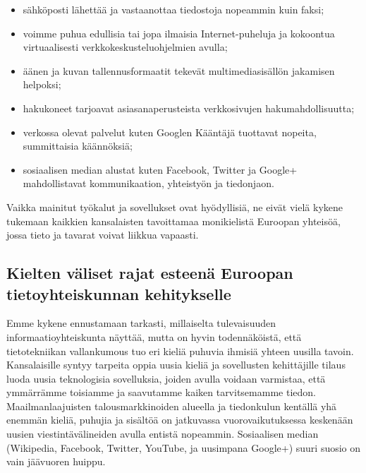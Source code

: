 \begin{multicols}{2}
\begin{itemize}
\item sähköposti lähettää ja vastaanottaa tiedostoja nopeammin kuin faksi;

\item voimme puhua edullisia tai jopa ilmaisia Internet-puheluja ja kokoontua 
virtuaalisesti verkkokeskusteluohjelmien avulla;

\item äänen ja kuvan tallennusformaatit tekevät multimediasisällön jakamisen helpoksi;

\item hakukoneet tarjoavat asiasanaperusteista verkkosivujen hakumahdollisuutta;

\item verkossa olevat palvelut kuten Googlen Kääntäjä tuottavat nopeita, summittaisia
käännöksiä;

\item sosiaalisen median alustat kuten Facebook, Twitter ja Google+ mahdollistavat
kommunikaation, yhteistyön ja tiedonjaon.
\end{itemize}
Vaikka mainitut työkalut ja sovellukset ovat hyödyllisiä, ne eivät vielä kykene
tukemaan kaikkien kansalaisten tavoittamaa monikielistä Euroopan yhteisöä,
jossa tieto ja tavarat voivat liikkua vapaasti.


\subsection{Kielten väliset rajat esteenä Euroopan tietoyhteiskunnan kehitykselle}

Emme kykene ennustamaan tarkasti, millaiselta tulevaisuuden
informaatioyhteiskunta näyttää, mutta on hyvin todennäköistä, että
tietotekniikan vallankumous tuo eri kieliä puhuvia ihmisiä yhteen uusilla
tavoin. Kansalaisille syntyy tarpeita oppia uusia kieliä ja sovellusten
kehittäjille tilaus luoda uusia teknologisia sovelluksia, joiden avulla voidaan 
varmistaa, että ymmärrämme toisiamme ja saavutamme kaiken tarvitsemamme tiedon.
Maailmanlaajuisten talousmarkkinoiden alueella ja tiedonkulun kentällä yhä enemmän
kieliä, puhujia ja sisältöä on jatkuvassa vuorovaikutuksessa keskenään uusien
viestintävälineiden avulla entistä nopeammin. Sosiaalisen median (Wikipedia,
Facebook, Twitter, YouTube, ja uusimpana Google+) suuri suosio on vain
jäävuoren huippu.


\end{multicols}
